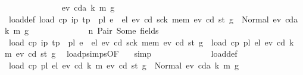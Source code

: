\begin{isabellebody}
\ \ \ \ \ \ \ \ \ \ \ \ \isamarkupfalse%
\ ev\ cda\ k\ m\ g{\isacharprime}{\kern0pt}\ \isamarkupfalse%
\ load{\isacharunderscore}{\kern0pt}def{\isacharcolon}{\kern0pt}\ {\isachardoublequoteopen}load\ cp\ {\isacharparenleft}{\kern0pt}{\isacharparenleft}{\kern0pt}i\isactrlsub p{\isacharcomma}{\kern0pt}\ t\isactrlsub p{\isacharparenright}{\kern0pt}\ {\isacharhash}{\kern0pt}\ pl{\isacharparenright}{\kern0pt}\ {\isacharparenleft}{\kern0pt}e\ {\isacharhash}{\kern0pt}\ el{\isacharparenright}{\kern0pt}\ e\isactrlsub v{\isacharprime}{\kern0pt}\ cd{\isacharprime}{\kern0pt}\ sck{\isacharprime}{\kern0pt}\ mem{\isacharprime}{\kern0pt}\ e\isactrlsub v\ cd\ st\ g\ {\isacharequal}{\kern0pt}\ Normal\ {\isacharparenleft}{\kern0pt}{\isacharparenleft}{\kern0pt}ev{\isacharcomma}{\kern0pt}\ cda{\isacharcomma}{\kern0pt}\ k{\isacharcomma}{\kern0pt}\ m{\isacharparenright}{\kern0pt}{\isacharcomma}{\kern0pt}\ g{\isacharprime}{\kern0pt}{\isacharparenright}{\kern0pt}{\isachardoublequoteclose}\isanewline
\ \ \ \ \ \ \ \ \ \ \ \ \isamarkupfalse%
\ n\ Pair\ Some\ fields\ \isamarkupfalse%
\ {\isachardoublequoteopen}load\ cp\ {\isacharparenleft}{\kern0pt}{\isacharparenleft}{\kern0pt}i\isactrlsub p{\isacharcomma}{\kern0pt}\ t\isactrlsub p{\isacharparenright}{\kern0pt}\ {\isacharhash}{\kern0pt}\ pl{\isacharparenright}{\kern0pt}\ {\isacharparenleft}{\kern0pt}e\ {\isacharhash}{\kern0pt}\ el{\isacharparenright}{\kern0pt}\ e\isactrlsub v{\isacharprime}{\kern0pt}\ cd{\isacharprime}{\kern0pt}\ sck{\isacharprime}{\kern0pt}\ mem{\isacharprime}{\kern0pt}\ e\isactrlsub v\ cd\ st\ g\ {\isacharequal}{\kern0pt}\ load\ cp\ pl\ el\ e\isactrlsub v{\isacharprime}{\kern0pt}{\isacharprime}{\kern0pt}\ cd{\isacharprime}{\kern0pt}{\isacharprime}{\kern0pt}\ k{\isacharprime}{\kern0pt}{\isacharprime}{\kern0pt}\ m{\isacharprime}{\kern0pt}{\isacharprime}{\kern0pt}\ e\isactrlsub v\ cd\ st\ g{\isacharprime}{\kern0pt}{\isacharprime}{\kern0pt}{\isachardoublequoteclose}\ \isamarkupfalse%
\ load{\isachardot}{\kern0pt}psimps{\isacharparenleft}{\kern0pt}{}{\isacharparenright}{\kern0pt}{\isacharbrackleft}{\kern0pt}OF\ {}{}{\isacharparenleft}{\kern0pt}{}{\isacharparenright}{\kern0pt}{\isacharbrackright}{\kern0pt}\ \isamarkupfalse%
\ simp\isanewline
\ \ \ \ \ \ \ \ \ \ \ \ \isamarkupfalse%
\ load{\isacharunderscore}{\kern0pt}def\ \isamarkupfalse%
\ {\isachardoublequoteopen}load\ cp\ pl\ el\ e\isactrlsub v{\isacharprime}{\kern0pt}{\isacharprime}{\kern0pt}\ cd{\isacharprime}{\kern0pt}{\isacharprime}{\kern0pt}\ k{\isacharprime}{\kern0pt}{\isacharprime}{\kern0pt}\ m{\isacharprime}{\kern0pt}{\isacharprime}{\kern0pt}\ e\isactrlsub v\ cd\ st\ g{\isacharprime}{\kern0pt}{\isacharprime}{\kern0pt}\ {\isacharequal}{\kern0pt}\ Normal\ {\isacharparenleft}{\kern0pt}{\isacharparenleft}{\kern0pt}ev{\isacharcomma}{\kern0pt}\ cda{\isacharcomma}{\kern0pt}\ k{\isacharcomma}{\kern0pt}\ m{\isacharparenright}{\kern0pt}{\isacharcomma}{\kern0pt}\ g{\isacharprime}{\kern0pt}{\isacharparenright}{\kern0pt}{\isachardoublequoteclose}\ \isamarkupfalse%

\end{isabellebody}
